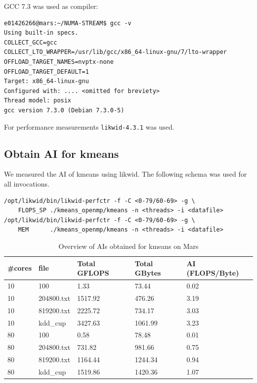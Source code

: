 \noindent GCC 7.3 was used as compiler:

\begin{verbatim}
e01426266@mars:~/NUMA-STREAM$ gcc -v
Using built-in specs.
COLLECT_GCC=gcc
COLLECT_LTO_WRAPPER=/usr/lib/gcc/x86_64-linux-gnu/7/lto-wrapper
OFFLOAD_TARGET_NAMES=nvptx-none
OFFLOAD_TARGET_DEFAULT=1
Target: x86_64-linux-gnu
Configured with: .... <omitted for breviety>
Thread model: posix
gcc version 7.3.0 (Debian 7.3.0-5)
\end{verbatim}

\noindent For performance measurements \texttt{likwid-4.3.1} was used.

\subsection{Obtain AI for kmeans}

We measured the AI of kmeans using likwid. The following schema was used for all invocations.
\begin{verbatim}
/opt/likwid/bin/likwid-perfctr -f -C <0-79/60-69> -g \
    FLOPS_SP ./kmeans_openmp/kmeans -n <threads> -i <datafile>
/opt/likwid/bin/likwid-perfctr -f -C <0-79/60-69> -g \
    MEM      ./kmeans_openmp/kmeans -n <threads> -i <datafile>
\end{verbatim}



\begin{table}[h]
\centering
\caption{\label{tab:ai_tab}Overview of AIs obtained for kmeans on Mars}
\begin{small}
\begin{tabular}{lllll}
\toprule
\#cores & file & Total GFLOPS & Total GBytes & AI (FLOPS/Byte) \\
\midrule
10 & 100 & 1.33 & 73.44 & 0.02 \\
10 & 204800.txt & 1517.92 & 476.26 & 3.19 \\
10 & 819200.txt & 2225.72 & 734.17 & 3.03 \\
10 & kdd\_cup & 3427.63 & 1061.99 & 3.23 \\
80 & 100 & 0.58 & 78.48 & 0.01 \\
80 & 204800.txt & 731.82 & 981.66 & 0.75 \\
80 & 819200.txt & 1164.44 & 1244.34 & 0.94 \\
80 & kdd\_cup & 1519.86 & 1420.36 & 1.07 \\
\bottomrule
\end{tabular}
\end{small}
\end{table}

